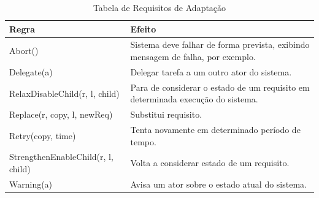 \begin{table}[h]
	\centering
	\caption{Tabela de Requisitos de Adaptação}
	\label{awreqs-zanshin}
	\begin{tabularx}{\textwidth}{|l|X|}
		\hline
		\textbf{Regra}                              & \textbf{Efeito}                                                                          \\ \hline
		Abort()                            & Sistema deve falhar de forma prevista, exibindo mensagem de falha, por exemplo. \\ \hline
		Delegate(a)                        & Delegar tarefa a um outro ator do sistema.                                      \\ \hline
		RelaxDisableChild(r, l, child)     & Para de considerar o estado de um requisito em determinada execução do sistema. \\ \hline
		Replace(r, copy, l, newReq)        & Substitui requisito.                                                            \\ \hline
		Retry(copy, time)                  & Tenta novamente em determinado período de tempo.                                \\ \hline
		StrengthenEnableChild(r, l, child) & Volta a considerar estado de um requisito.                                      \\ \hline
		Warning(a)                         & Avisa um ator sobre o estado atual do sistema.                                  \\ \hline
	\end{tabularx}
\end{table}



